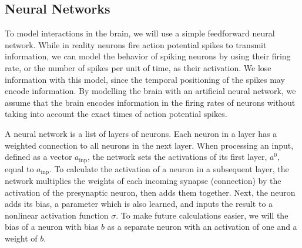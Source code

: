 \documentclass[12pt]{article}
\begin{document}
\subsection{Neural Networks}
To model interactions in the brain, we will use a simple feedforward neural network. While in reality neurons fire action potential spikes to transmit information, we can model the behavior of spiking neurons by using their firing rate, or the number of spikes per unit of time, as their activation. We lose information with this model, since the temporal positioning of the spikes may encode information. By modelling the brain with an artificial neural network, we assume that the brain encodes information in the firing rates of neurons without taking into account the exact times of action potential spikes.

A neural network is a list of layers of neurons. Each neuron in a layer has a weighted connection to all neurons in the next layer. When processing an input, defined as a vector $a_{\text{inp}}$, the network sets the activations of its first layer, $a^0$, equal to $a_{\text{inp}}$. To calculate the activation of a neuron in a subsequent layer, the network multiplies the weights of each incoming synapse (connection) by the activation of the presynaptic neuron, then adds them together. Next, the neuron adds its bias, a parameter which is also learned, and inputs the result to a nonlinear activation function $\sigma$. To make future calculations easier, we will the bias of a neuron with bias $b$ as a separate neuron with an activation of one and a weight of $b$.
\end{document}
